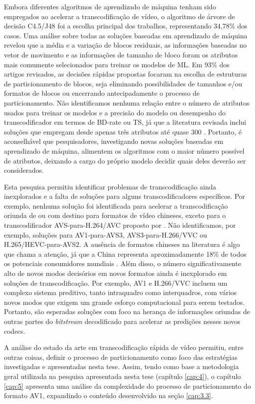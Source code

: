Embora diferentes algoritmos de aprendizado de máquina tenham sido empregados ao acelerar a transcodificação de vídeo, o algoritmo de árvore de decisão C4.5/J48 foi a escolha principal dos trabalhos, representando 34,78\% dos casos. Uma análise sobre todas as soluções baseadas em aprendizado de máquina revelou que a média e a variação de blocos residuais, as informações baseadas no vetor de movimento e as informações de tamanho de bloco foram os atributos mais comumente selecionados para treinar os modelos de ML. Em 93\% dos artigos revisados, as decisões rápidas propostas focaram na escolha de estruturas de particionamento de blocos, seja eliminando possibilidades de tamanhos e/ou formatos de blocos ou encerrando antecipadamente o processo de particionamento. Não identificamos nenhuma relação entre o número de atributos usados para treinar os modelos e a precisão do modelo ou desempenho do transcodificador em termos de BD-rate ou TS, já que a literatura revisada inclui soluções que empregam desde apenas três atributos \cite{bib:chen_2019, bib:wei_2017} até quase 300 \cite{bib:fernandez2_2006, bib:holder_2009}. Portanto, é aconselhável que pesquisadores, investigando novas soluções baseadas em aprendizado de máquina, alimentem os algoritmos com o maior número possível de atributos, deixando a cargo do próprio modelo decidir quais deles deverão ser considerados.

Esta pesquisa permitiu identificar problemas de transcodificação ainda inexplorados e a falta de soluções para alguns transcodificadores específicos. Por exemplo, nenhuma solução foi identificada para acelerar a transcodificação oriunda de ou com destino para formatos de vídeo chineses, exceto para o transcodificador AVS-para-H.264/AVC proposto por \citet{bib:jin_2011}. Não identificamos, por exemplo, soluções para AV1-para-AVS3, AVS3-para-H.266/VVC ou H.265/HEVC-para-AVS2. A ausência de formatos chineses na literatura é algo que chama a atenção, já que a China representa aproximadamente 18\% de todos os potenciais consumidores mundiais \cite{bib:world_population}. Além disso, o número significativamente alto de novos modos decisórios em novos formatos ainda é inexplorado em soluções de transcodificação. Por exemplo, AV1 e H.266/VVC incluem um complexo sistema preditivo, tanto intraquadro como interquadros, com vários novos modos que exigem um grande esforço computacional para serem testados. Portanto, são esperadas soluções com foco na herança de informações oriundas de outras partes do \textit{bitstream} decodificado para acelerar as predições nesses novos codecs.

A análise do estado da arte em transcodificação rápida de vídeo permitiu, entre outras coisas, definir o processo de particionamento como foco das estratégias investigadas e apresentadas nesta tese. Assim, tendo como base a metodologia geral utilizada na pesquisa apresentada nesta tese (capítulo \ref{cap:4}), o capítulo \ref{cap:5} apresenta uma análise da complexidade do processo de particionamento do formato AV1, expandindo o conteúdo desenvolvido na seção \ref{cap:3.3}.
